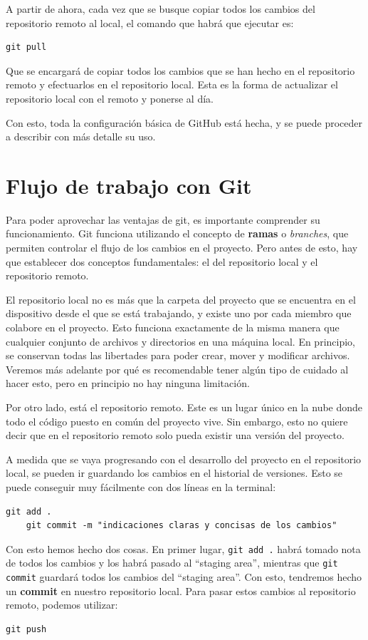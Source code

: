 \documentclass[
twoside,
12pt,                   
]{article}
\begin{document}
A partir de ahora, cada vez que se busque copiar todos los cambios del repositorio remoto al local, el comando que habrá que ejecutar es:
\begin{lstlisting}[style=powershell]
    git pull
\end{lstlisting}

Que se encargará de copiar todos los cambios que se han hecho en el repositorio remoto y efectuarlos en el repositorio local. Esta es la forma de actualizar el repositorio local con el remoto y ponerse al día.
\par Con esto, toda la configuración básica de GitHub está hecha, y se puede proceder a describir con más detalle su uso.

\section{Flujo de trabajo con Git}
Para poder aprovechar las ventajas de git, es importante comprender su funcionamiento. Git funciona utilizando el concepto de \textbf{ramas} o \textit{branches}, que permiten controlar el flujo de los cambios en el proyecto. Pero antes de esto, hay que establecer dos conceptos fundamentales: el del repositorio local y el repositorio remoto.
\par El repositorio local no es más que la carpeta del proyecto que se encuentra en el dispositivo desde el que se está trabajando, y existe uno por cada miembro que colabore en el proyecto. Esto funciona exactamente de la misma manera que cualquier conjunto de archivos y directorios en una máquina local. En principio, se conservan todas las libertades para poder crear, mover y modificar archivos. Veremos más adelante por qué es recomendable tener algún tipo de cuidado al hacer esto, pero en principio no hay ninguna limitación.
\par Por otro lado, está el repositorio remoto. Este es un lugar único en la nube donde todo el código puesto en común del proyecto vive. Sin embargo, esto no quiere decir que en el repositorio remoto solo pueda existir una versión del proyecto.
\par A medida que se vaya progresando con el desarrollo del proyecto en el repositorio local, se pueden ir guardando los cambios en el historial de versiones. Esto se puede conseguir muy fácilmente con dos líneas en la terminal:
\begin{lstlisting}[style=powershell]
    git add .
    git commit -m "indicaciones claras y concisas de los cambios"
\end{lstlisting}
Con esto hemos hecho dos cosas. En primer lugar, \texttt{git add{ }.} habrá tomado nota de todos los cambios y los habrá pasado al ``staging area'', mientras que \texttt{git commit} guardará todos los cambios del ``staging area''. Con esto, tendremos hecho un \textbf{commit} en nuestro repositorio local. Para pasar estos cambios al repositorio remoto, podemos utilizar:
\begin{lstlisting}[style=powershell]
    git push
\end{lstlisting}
\end{document}
